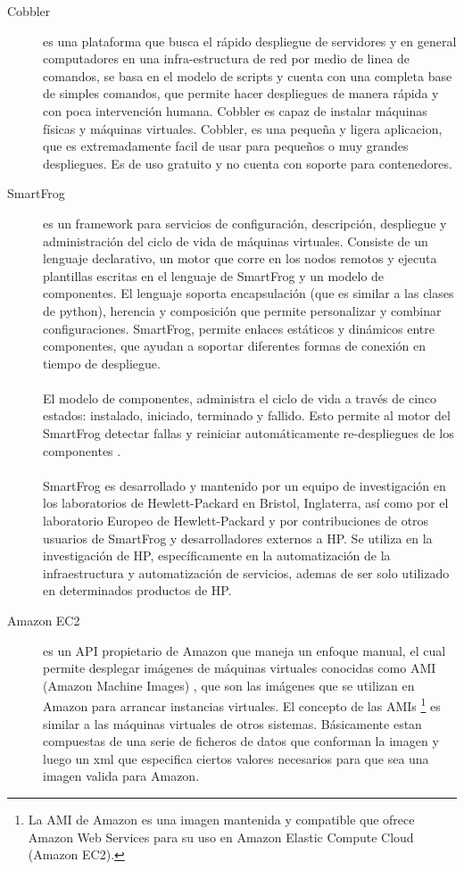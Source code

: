 \begin{description}
\item [Cobbler]
 es una plataforma que busca el rápido despliegue de servidores y en general computadores en una infra-estructura de red por medio de linea de comandos, se basa en el modelo de scripts y cuenta con una completa base de simples comandos, que permite hacer despliegues de manera rápida y con poca intervención humana. Cobbler es capaz de instalar máquinas físicas y máquinas virtuales. Cobbler, es una pequeña y ligera aplicacion, que es extremadamente facil de usar para pequeños o muy grandes despliegues. Es de uso gratuito y no cuenta con soporte para contenedores. \cite{Cobbler15}

\item [SmartFrog]
 es un framework para servicios de configuración, descripción, despliegue y administración del ciclo de vida de máquinas virtuales. Consiste de un lenguaje declarativo, un motor que corre en los nodos remotos y ejecuta plantillas escritas en el lenguaje de SmartFrog y un modelo de componentes. El lenguaje soporta encapsulación (que es similar a las clases de python), herencia y composición que permite personalizar y combinar configuraciones. SmartFrog, permite enlaces estáticos y dinámicos entre componentes, que ayudan a soportar diferentes formas de conexión en tiempo de despliegue.\\
\\
El modelo de componentes, administra el ciclo de vida a través de cinco estados: instalado, iniciado, terminado y fallido. Esto permite al motor del SmartFrog detectar fallas y reiniciar automáticamente re-despliegues de los componentes \cite{Smart09}.\\
\\
SmartFrog es desarrollado y mantenido por un equipo de investigación en los laboratorios de Hewlett-Packard en Bristol, Inglaterra, así como por el laboratorio Europeo de Hewlett-Packard y por contribuciones de otros usuarios de SmartFrog y desarrolladores externos a HP. Se utiliza en la investigación de HP, específicamente en la automatización de la infraestructura y automatización de servicios, ademas de ser solo utilizado en determinados productos de HP.

\item [Amazon EC2]
es un API propietario de Amazon que maneja un enfoque manual, el cual permite desplegar imágenes de máquinas virtuales conocidas como AMI (Amazon Machine Images) \cite{Amazon16}, que son las imágenes que se utilizan en Amazon para arrancar instancias virtuales. El concepto de las AMIs \footnote{La AMI de Amazon es una imagen mantenida y compatible que ofrece Amazon Web Services para su uso en Amazon Elastic Compute Cloud (Amazon EC2).} es similar a las máquinas virtuales de otros sistemas. Básicamente estan compuestas de una serie de ficheros de datos que conforman la imagen y luego un xml que especifica ciertos valores necesarios para que sea una imagen valida para Amazon. 


\end{description}
